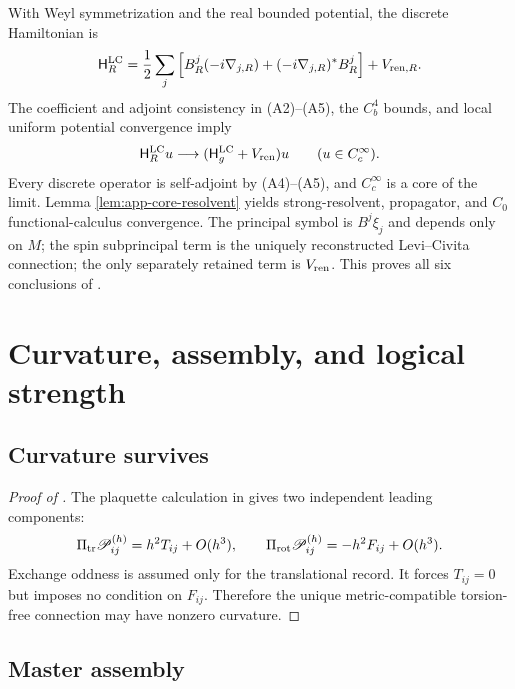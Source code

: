 \documentclass[11pt]{article}
\theoremstyle{definition}
\theoremstyle{remark}
\newcommand{\Ham}{\mathsf H}
\newcommand{\LC}{\mathrm{LC}}
\begin{document}
With Weyl symmetrization and the real bounded potential, the discrete
Hamiltonian is
\[
 \Ham_R^{\LC}
 =\frac12\sum_j\left[B_R^j(-i\nabla_{j,R})
 +(-i\nabla_{j,R})^*B_R^j\right]+V_{{\rm ren},R}.
\]
The coefficient and adjoint consistency in \textup{(A2)--(A5)}, the $C_b^4$
bounds, and local uniform potential convergence imply
\[
 \Ham_R^{\LC}u\longrightarrow
 (\Ham_g^{\LC}+V_{\rm ren})u
 \qquad(u\in C_c^\infty).
\]
Every discrete operator is self-adjoint by \textup{(A4)}--\textup{(A5)}, and
$C_c^\infty$ is a core of the limit.  Lemma
\ref{lem:app-core-resolvent} yields strong-resolvent, propagator, and $C_0$
functional-calculus convergence.  The principal symbol is
$B^j\xi_j$ and depends only on $M$; the spin subprincipal term is the uniquely
reconstructed Levi--Civita connection; the only separately retained term is
$V_{\rm ren}$.  This proves all six conclusions of .

\section{Curvature, assembly, and logical strength}
\label{app:proof-master}

\subsection{Curvature survives}
\label{app:proof-curvature-survives}

\begin{proof}[Proof of ]
The plaquette calculation in  gives two independent
leading components:
\[
 \Pi_{\rm tr}\mathscr P_{ij}^{(h)}=h^2T_{ij}+O(h^3),
 \qquad
 \Pi_{\rm rot}\mathscr P_{ij}^{(h)}=-h^2F_{ij}+O(h^3).
\]
Exchange oddness is assumed only for the translational record.  It forces
$T_{ij}=0$ but imposes no condition on $F_{ij}$.  Therefore the unique
metric-compatible torsion-free connection may have nonzero curvature.
\end{proof}

\subsection{Master assembly}
\end{document}
